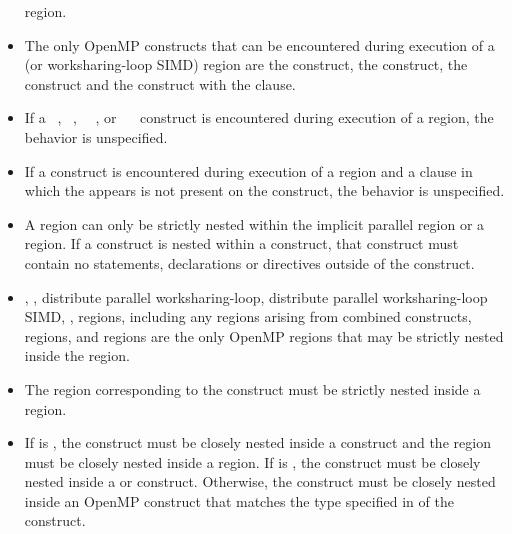 \begin{itemize}
       region.
\item The only OpenMP constructs that can be encountered during execution of a
       (or worksharing-loop SIMD) region are the  construct,
      the  construct, the  construct and the  
      construct with the  clause.
\item If a ~, ~,
      ~~, or
      ~~ construct is encountered during
      execution of a  region, the behavior is unspecified.
\item If a  construct is encountered during execution of a
       region and a  clause in which the 
        appears is not present on 
      the construct, the behavior is unspecified.
\item A  region can only be strictly nested within the implicit 
      parallel region or a  region. If a  construct 
      is nested within a  construct, that  construct 
      must contain no statements, declarations or directives outside of the 
       construct.
\item {}, , distribute parallel 
      worksharing-loop, distribute parallel worksharing-loop SIMD, , 
       regions, including any  regions arising 
      from combined constructs,  regions, and 
       regions are the only OpenMP regions
      that may be strictly nested inside the  region.
\item The region corresponding to the  construct must be
      strictly nested inside a  region.
\item If  is , the 
      construct must be closely nested inside a  construct and the
       region must be closely nested inside a  
      region. If  is , the 
       construct must be closely nested inside a  
      or  construct. Otherwise, the  construct must 
      be closely nested inside an OpenMP construct that matches the type 
      specified in  of the  construct.

\end{itemize}
